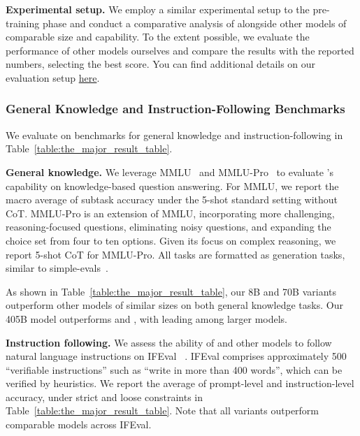 \documentclass[dvipsnames]{fairmeta}
\begin{document}
\textbf{Experimental setup.} We employ a similar experimental setup to the pre-training phase and conduct a comparative analysis of \llamathree alongside other models of comparable size and capability. To the extent possible, we evaluate the performance of other models ourselves and compare the results with the reported numbers, selecting the best score.
You can find additional details on our evaluation setup \href{https://github.com/meta-llama/llama-models/blob/main/models/llama3_1/eval_details.md}{here}.

\subsubsection{General Knowledge and Instruction-Following Benchmarks}
We evaluate \llamathree on benchmarks for general knowledge and instruction-following in Table~\ref{table:the_major_result_table}.

\textbf{General knowledge.} We leverage MMLU~\citep{hendrycks2021mmlu} and MMLU-Pro~\citep{wang2024mmlu} to evaluate \llamathree's capability on knowledge-based question answering. For MMLU, we report the macro average of subtask accuracy under the 5-shot standard setting without CoT. MMLU-Pro is an extension of MMLU, incorporating more challenging, reasoning-focused questions, eliminating noisy questions, and expanding the choice set from four to ten options. Given its focus on complex reasoning, we report 5-shot CoT for MMLU-Pro. All tasks are formatted as generation tasks, similar to simple-evals~\citep{simpleevals}.

As shown in Table~\ref{table:the_major_result_table}, our 8B and 70B \llamathree variants outperform other models of similar sizes on both general knowledge tasks. Our 405B model outperforms \gptp and \nemotron, with \sonnet leading among larger models.

\textbf{Instruction following.} We assess the ability of \llamathree and other models to follow natural language instructions on IFEval ~\citep{zhou2023instruction}. IFEval comprises approximately 500 ``verifiable instructions'' such as ``write in more than 400 words'', which can be verified by heuristics. We report the average of prompt-level and instruction-level accuracy, under strict and loose constraints in Table~\ref{table:the_major_result_table}. Note that all \llamathree variants outperform comparable models across IFEval.
\end{document}
